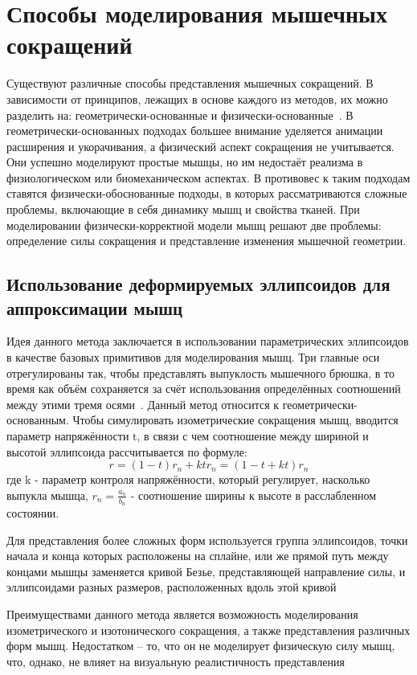 \section{Способы моделирования мышечных сокращений}
\label{sec:muscle_meth}
Существуют различные способы представления мышечных сокращений. В зависимости от принципов, лежащих в основе каждого из методов, их можно разделить на: геометрически-основанные и физически-основанные~\cite{diff_methods}. В геометрически-основанных подходах большее внимание уделяется анимации расширения и укорачивания, а физический аспект сокращения не учитывается. Они успешно моделируют простые мышцы, но им недостаёт реализма в физиологическом или биомеханическом аспектах. В противовес к таким подходам ставятся физически-обоснованные подходы, в которых рассматриваются сложные проблемы, включающие в себя динамику мышц и свойства тканей. При моделировании физически-корректной модели мышц решают две проблемы: определение силы сокращения и представление изменения мышечной геометрии.

\subsection{Использование деформируемых эллипсоидов для аппроксимации мышц}
\label{subsec:elypsoids}
Идея данного метода заключается в использовании параметрических эллипсоидов в качестве базовых примитивов для моделирования мышц. Три главные оси отрегулированы так, чтобы представлять выпуклость мышечного брюшка, в то время как объём сохраняется за счёт использования определённых соотношений между этими тремя осями~\cite{scheepers97}. Данный метод относится к геометрически-основанным. Чтобы симулировать изометрические сокращения мышц, вводится параметр напряжённости t, в связи с чем соотношение между шириной и высотой эллипсоида рассчитывается по формуле:
\begin{equation}\label{r_eq}
r = (1 - t)r_{n} + ktr_{n} = (1 - t + kt)r_{n}
\end{equation}
где k - параметр контроля напряжённости, который регулирует, насколько выпукла мышца, $r_{n} = \frac{a_{n}}{b_{n}}$ - соотношение ширины к высоте в расслабленном состоянии. 
\par Для представления более сложных форм используется группа эллипсоидов, точки начала и конца которых расположены на сплайне, или же прямой путь между концами мышцы заменяется кривой Безье, представляющей направление силы, и эллипсоидами разных размеров, расположенных вдоль этой кривой~\cite{scheepers97}
\par Преимуществами данного метода является возможность моделирования изометрического и изотонического сокращения, а также представления различных форм мышц. Недостатком -- то, что он не моделирует физическую силу мышц, что, однако, не влияет на визуальную реалистичность представления

